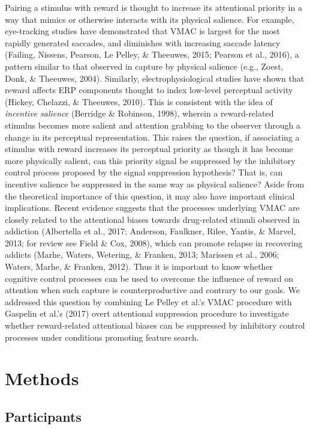 \documentclass[man, a4paper, noextraspace, 11pt,floatsintext]{apa6}
\theoremstyle{definition}
\theoremstyle{definition}
\theoremstyle{definition}
\theoremstyle{remark}
\begin{document}
Pairing a stimulus with reward is thought to increase its attentional
priority in a way that mimics or otherwise interacts with its physical
salience. For example, eye-tracking studies have demonstrated that VMAC
is largest for the most rapidly generated saccades, and diminishes with
increasing saccade latency (Failing, Nissens, Pearson, Le Pelley, \&
Theeuwes, 2015; Pearson et al., 2016), a pattern similar to that
observed in capture by physical salience (e.g., Zoest, Donk, \&
Theeuwes, 2004). Similarly, electrophysiological studies have shown that
reward affects ERP components thought to index low-level perceptual
activity (Hickey, Chelazzi, \& Theeuwes, 2010). This is consistent with
the idea of \emph{incentive salience} (Berridge \& Robinson, 1998),
wherein a reward-related stimulus becomes more salient and attention
grabbing to the observer through a change in its perceptual
representation. This raises the question, if associating a stimulus with
reward increases its perceptual priority as though it has become more
physically salient, can this priority signal be suppressed by the
inhibitory control process proposed by the signal suppression
hypothesis? That is, can incentive salience be suppressed in the same
way as physical salience? Aside from the theoretical importance of this
question, it may also have important clinical implications. Recent
evidence suggests that the processes underlying VMAC are closely related
to the attentional biases towards drug-related stimuli observed in
addiction (Albertella et al., 2017; Anderson, Faulkner, Rilee, Yantis,
\& Marvel, 2013; for review see Field \& Cox, 2008), which can promote
relapse in recovering addicts (Marhe, Waters, Wetering, \& Franken,
2013; Marissen et al., 2006; Waters, Marhe, \& Franken, 2012). Thus it
is important to know whether cognitive control processes can be used to
overcome the influence of reward on attention when such capture is
counterproductive and contrary to our goals. We addressed this question
by combining Le Pelley et al.'s VMAC procedure with Gaspelin et al.'s
(2017) overt attentional suppression procedure to investigate whether
reward-related attentional biases can be suppressed by inhibitory
control processes under conditions promoting feature search.

\section{Methods}\label{methods}

\subsection{Participants}\label{participants}
\end{document}
